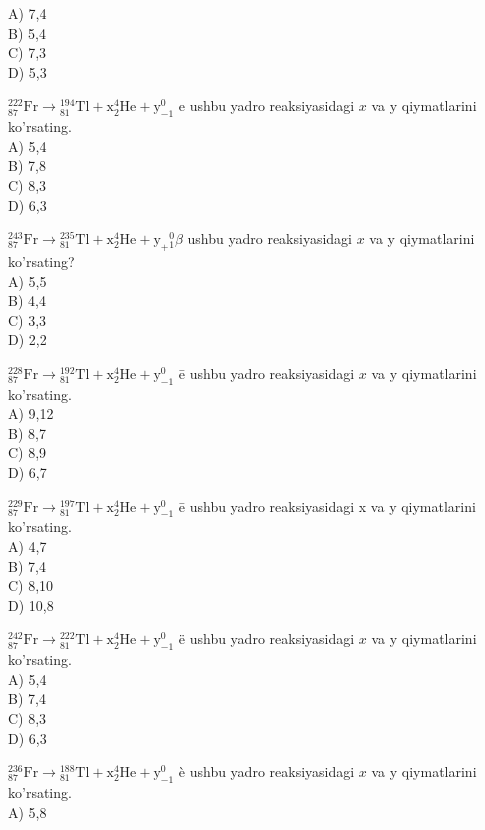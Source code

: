 A) 7,4\\
B) 5,4\\
C) 7,3\\
D) 5,3
  \item ${ }_{87}^{222} \mathrm{Fr} \rightarrow{ }_{81}^{194} \mathrm{Tl}+\mathrm{x}_{2}^{4} \mathrm{He}+\mathrm{y}_{-1}^{0}$ e ushbu yadro reaksiyasidagi $x$ va y qiymatlarini ko'rsating.\\
A) 5,4\\
B) 7,8\\
C) 8,3\\
D) 6,3
  \item ${ }_{87}^{243} \mathrm{Fr} \rightarrow{ }_{81}^{235} \mathrm{Tl}+\mathrm{x}_{2}^{4} \mathrm{He}+\mathrm{y}_{+}{ }_{1}^{0} \beta$ ushbu yadro reaksiyasidagi $x$ va y qiymatlarini ko'rsating?\\
A) 5,5\\
B) 4,4\\
C) 3,3\\
D) 2,2
  \item ${ }_{87}^{228} \mathrm{Fr} \rightarrow{ }_{81}^{192} \mathrm{Tl}+\mathrm{x}_{2}^{4} \mathrm{He}+\mathrm{y}_{-1}^{0}$ ē ushbu yadro reaksiyasidagi $x$ va y qiymatlarini ko'rsating.\\
A) 9,12\\
B) 8,7\\
C) 8,9\\
D) 6,7
  \item ${ }_{87}^{229} \mathrm{Fr} \rightarrow{ }_{81}^{197} \mathrm{Tl}+\mathrm{x}_{2}^{4} \mathrm{He}+\mathrm{y}_{-1}^{0}$ ē ushbu yadro reaksiyasidagi x va y qiymatlarini ko'rsating.\\
A) 4,7\\
B) 7,4\\
C) 8,10\\
D) 10,8
  \item ${ }_{87}^{242} \mathrm{Fr} \rightarrow{ }_{81}^{222} \mathrm{Tl}+\mathrm{x}_{2}^{4} \mathrm{He}+\mathrm{y}_{-1}^{0}$ ë ushbu yadro reaksiyasidagi $x$ va y qiymatlarini ko'rsating.\\
A) 5,4\\
B) 7,4\\
C) 8,3\\
D) 6,3
  \item ${ }_{87}^{236} \mathrm{Fr} \rightarrow{ }_{81}^{188} \mathrm{Tl}+\mathrm{x}_{2}^{4} \mathrm{He}+\mathrm{y}_{-1}^{0}$ è ushbu yadro reaksiyasidagi $x$ va y qiymatlarini ko'rsating.\\
A) 5,8\\
